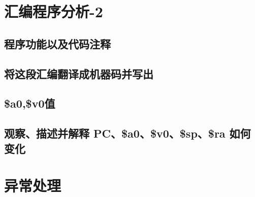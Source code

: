 \documentclass{article}
\begin{document}
\section{汇编程序分析-2}
\subsection{程序功能以及代码注释}
\subsection{将这段汇编翻译成机器码并写出}
\subsection{\$a0,\$v0值}
\subsection{观察、描述并解释 PC、\$a0、\$v0、\$sp、\$ra 如何变化}

\section{异常处理}

\end{document}
